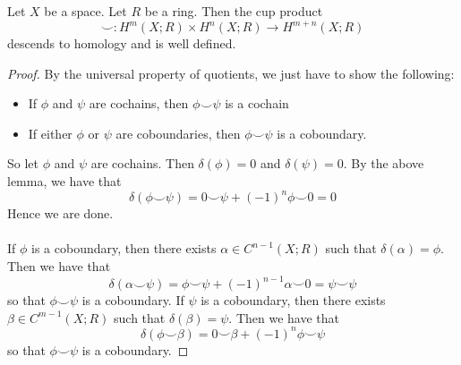 \documentclass[a4paper]{article}
\begin{document}
\begin{prp}{}{} Let $X$ be a space. Let $R$ be a ring. Then the cup product $$\smile:H^m(X;R)\times H^n(X;R)\to H^{m+n}(X;R)$$ descends to homology and is well defined. \tcbline
\begin{proof}
By the universal property of quotients, we just have to show the following: 
\begin{itemize}
\item If $\phi$ and $\psi$ are cochains, then $\phi\smile\psi$ is a cochain
\item If either $\phi$ or $\psi$ are coboundaries, then $\phi\smile\psi$ is a coboundary. 
\end{itemize}
So let $\phi$ and $\psi$ are cochains. Then $\delta(\phi)=0$ and $\delta(\psi)=0$. By the above lemma, we have that $$\delta(\phi\smile\psi)=0\smile\psi+(-1)^n\phi\smile 0=0$$ Hence we are done. \\~\\

If $\phi$ is a coboundary, then there exists $\alpha\in C^{n-1}(X;R)$ such that $\delta(\alpha)=\phi$. Then we have that $$\delta(\alpha\smile\psi)=\phi\smile\psi+(-1)^{n-1}\alpha\smile 0=\psi\smile\psi$$ so that $\phi\smile\psi$ is a coboundary. If $\psi$ is a coboundary, then there exists $\beta\in C^{m-1}(X;R)$ such that $\delta(\beta)=\psi$. Then we have that $$\delta(\phi\smile\beta)=0\smile\beta+(-1)^n\phi\smile\psi$$ so that $\phi\smile\psi$ is a coboundary. 
\end{proof}
\end{prp}
\end{document}
